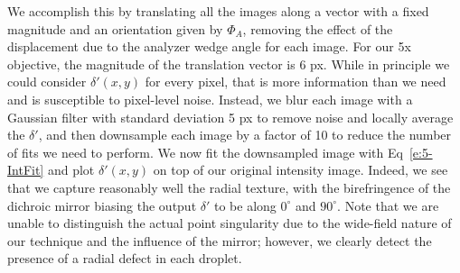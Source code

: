 We accomplish this by translating all the images along a vector with a fixed magnitude and an orientation given by $\Phi_A$, removing the effect of the displacement due to the analyzer wedge angle for each image.
For our 5x objective, the magnitude of the translation vector is 6 px.
While in principle we could consider $\delta'(x,y)$ for every pixel, that is more information than we need and is susceptible to pixel-level noise.
Instead, we blur each image with a Gaussian filter with standard deviation 5 px to remove noise and locally average the $\delta'$, and then downsample each image by a factor of 10 to reduce the number of fits we need to perform.
We now fit the downsampled image with Eq~\ref{e:5-IntFit} and plot $\delta'(x,y)$ on top of our original intensity image.
Indeed, we see that we capture reasonably well the radial texture, with the birefringence of the dichroic mirror biasing the output $\delta'$ to be along $0^{\circ}$ and $90^{\circ}$.
Note that we are unable to distinguish the actual point singularity due to the wide-field nature of our technique and the influence of the mirror; however, we clearly detect the presence of a radial defect in each droplet.

